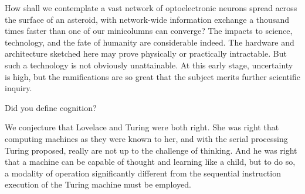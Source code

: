 How shall we contemplate a vast network of optoelectronic neurons spread across the surface of an asteroid, with network-wide information exchange a thousand times faster than one of our minicolumns can converge? The impacts to science, technology, and the fate of humanity are considerable indeed. The hardware and architecture sketched here may prove physically or practically intractable. But such a technology is not obviously unattainable. At this early stage, uncertainty is high, but the ramifications are so great that the subject merits further scientific inquiry.

\vspace{3em}
Did you define cognition?



We conjecture that Lovelace and Turing were both right. She was right that computing machines as they were known to her, and with the serial processing Turing proposed, really are not up to the challenge of thinking. And he was right that a machine can be capable of thought and learning like a child, but to do so, a modality of operation significantly different from the sequential instruction execution of the Turing machine must be employed.


